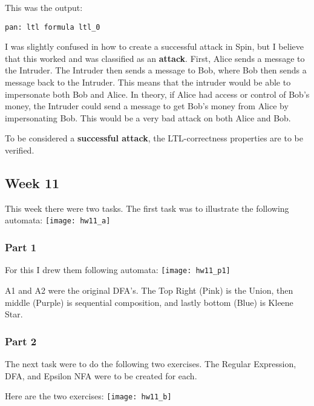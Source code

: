 \documentclass{article}
\theoremstyle{theorem}
\theoremstyle{definition}
\theoremstyle{remark}
\begin{document}
\noindent\newline This was the output:
\begin{verbatim}
pan: ltl formula ltl_0
\end{verbatim}

\noindent\newline I was slightly confused in how to create a successful attack in Spin, but I believe that this worked and was classified as an \textbf{attack}. First, Alice sends a message to the Intruder. The Intruder then sends a message to Bob, where Bob then sends a message back to the Intruder. This means that the intruder would be able to impersonate both Bob and Alice. In theory, if Alice had access or control of Bob's money, the Intruder could send a message to get Bob's money from Alice by impersonating Bob. This would be a very bad attack on both Alice and Bob.


\noindent\newline To be considered a \textbf{successful attack}, the LTL-correctness properties are to be verified.

\subsection{Week 11}
This week there were two tasks. The first task was to illustrate the following automata:\newline
\texttt{[image: hw11\_a]}

\subsubsection{Part 1}
\noindent\newline For this I drew them following automata:\newline
\texttt{[image: hw11\_p1]}

\noindent\newline A1 and A2 were the original DFA's. The Top Right (Pink) is the Union, then middle (Purple) is sequential composition, and lastly bottom (Blue) is Kleene Star.

\subsubsection{Part 2}
\noindent\newline The next task were to do the following two exercises. The Regular Expression, DFA, and Epsilon NFA were to be created for each.

\noindent\newline Here are the two exercises:\newline
\texttt{[image: hw11\_b]}
\end{document}
